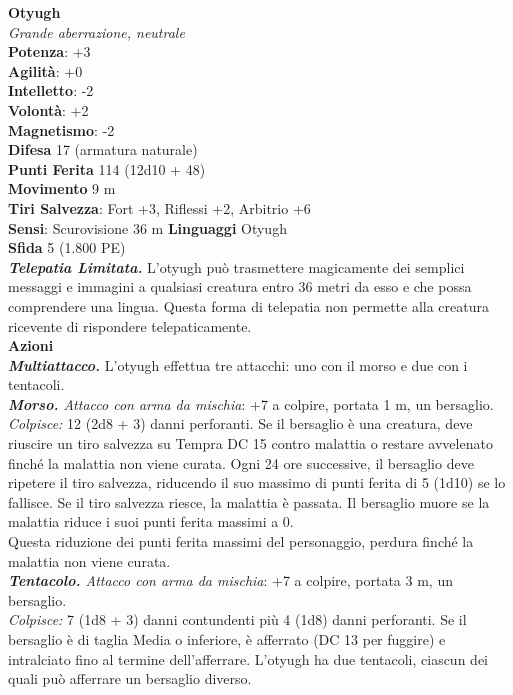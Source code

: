 \begin{multicols}{2}
\medskip\textbf{Otyugh}\\
\emph{Grande aberrazione, neutrale}\\
\textbf{Potenza}: +3\\
\textbf{Agilità}: +0\\
\textbf{Intelletto}: -2\\
\textbf{Volontà}: +2\\
\textbf{Magnetismo}: -2\\
\textbf{Difesa} 17 (armatura naturale)\\
\textbf{Punti Ferita} 114 (12d10 + 48)\\
\textbf{Movimento} 9 m\\
\textbf{Tiri Salvezza}: Fort +3, Riflessi +2, Arbitrio +6\\
\textbf{Sensi}: Scurovisione 36 m
\textbf{Linguaggi} Otyugh\\
\textbf{Sfida} 5 (1.800 PE)\smallskip\\
\emph{\textbf{Telepatia Limitata.}} L'otyugh può trasmettere magicamente dei semplici messaggi e immagini a qualsiasi creatura entro 36 metri da esso e che possa comprendere una lingua. Questa forma di telepatia non permette alla creatura ricevente di rispondere telepaticamente.\\
\smallskip\textbf{Azioni}\\
\emph{\textbf{Multiattacco.}} L'otyugh effettua tre attacchi: uno con il morso e due con i tentacoli.\\
\emph{\textbf{Morso.} Attacco con arma da mischia}: +7 a colpire, portata 1 m, un bersaglio.\\

\emph{Colpisce:} 12 (2d8 + 3) danni perforanti. Se il bersaglio è una creatura, deve riuscire un tiro salvezza su Tempra DC 15 contro malattia o restare avvelenato finché la malattia non viene curata. Ogni 24 ore successive, il bersaglio deve ripetere il tiro salvezza, riducendo il suo massimo di punti ferita di 5 (1d10) se lo fallisce. Se il tiro salvezza riesce, la malattia è passata. Il bersaglio muore se la malattia riduce i suoi punti ferita massimi a 0.\\
Questa riduzione dei punti ferita massimi del personaggio, perdura  finché la malattia non viene curata.\\
\emph{\textbf{Tentacolo.} Attacco con arma da mischia}: +7 a colpire, portata 3 m, un bersaglio.\\
\emph{Colpisce:} 7 (1d8 + 3) danni contundenti più 4 (1d8) danni perforanti. Se il bersaglio è di taglia Media o inferiore, è afferrato (DC 13 per fuggire) e intralciato fino al termine dell'afferrare. L'otyugh ha due tentacoli, ciascun dei quali può afferrare un bersaglio diverso.\\


\end{multicols}
